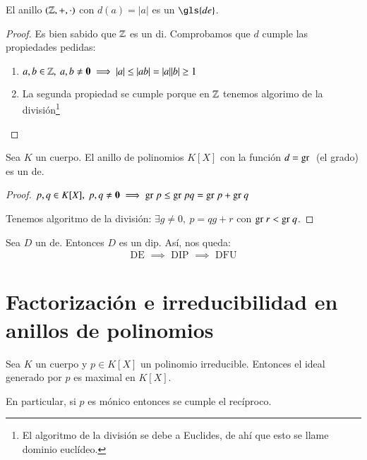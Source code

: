 \begin{ej}
	El anillo $(\mathbb{Z}, +, \cdot)$ con $d(a) = |a|$ es un $\gls{de}$.
\end{ej}

\begin{proof}
	Es bien sabido que $\mathbb{Z}$ es un \gls{di}. Comprobamos que $d$ cumple las propiedades pedidas:
	\begin{enumerate}
		\item $a,b \in \mathbb{Z},\ a,b \neq \mathbf{0} \implies |a| \leq |ab| = |a||b| \geq 1$
		\item La segunda propiedad se cumple porque en $\mathbb{Z}$ tenemos algorimo de la división\footnote{El algoritmo de la división se debe a Euclides, de ahí que esto se llame dominio euclídeo.}
	\end{enumerate}
\end{proof}

\begin{ej}
	Sea $K$ un cuerpo. El anillo de polinomios $K[X]$ con la función $d = \text{gr }$ (el grado) es un \gls{de}.
\end{ej}

\begin{proof}
	\item $p,q \in K[X],\ p,q \neq \mathbf{0} \implies \text{gr } p \leq \text{gr } pq = \text{gr } p + \text{gr } q$
	\item Tenemos algoritmo de la división: $\exists g \neq 0,\ p = qg + r$ con $\text{gr } r < \text{gr } q$.
\end{proof}

\begin{thm}Sea $D$ un \gls{de}. Entonces $D$ es un \gls{dip}. Así, nos queda:
	\begin{align*}
		\text{ DE } \implies \text{ DIP } \implies \text{ DFU }
	\end{align*}
\end{thm}


\section{Factorización e irreducibilidad en anillos de polinomios}



\begin{thm}\cite[p.~232]{dor96}
	\label{pro:irreducibleimpliesmaximal}
	Sea $K$ un cuerpo y $p \in K[X]$ un polinomio irreducible. Entonces el ideal generado por $p$ es maximal en $K[X]$.
\end{thm}

En particular, si $p$ es mónico entonces se cumple el recíproco.

